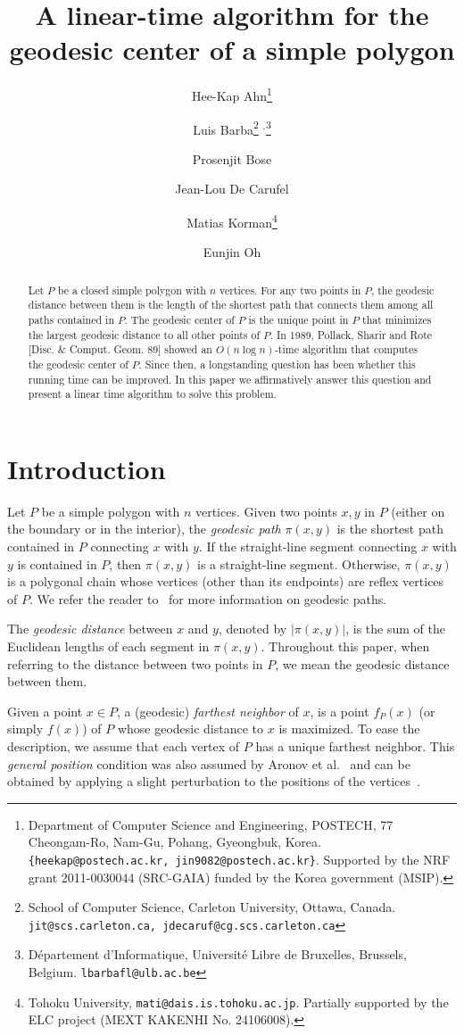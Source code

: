 \documentclass[a4paper]{article}
\title{A linear-time algorithm for the geodesic center of a simple polygon}
\author{
Hee-Kap Ahn\thanks{Department of Computer Science and Engineering, POSTECH,
77 Cheongam-Ro, Nam-Gu, Pohang, Gyeongbuk, Korea.  \texttt{\{heekap@postech.ac.kr, jin9082@postech.ac.kr\}}. Supported by the NRF grant 2011-0030044 (SRC-GAIA) funded by the Korea government (MSIP).}
\and
Luis Barba\thanks{School of Computer Science, Carleton University, Ottawa, Canada.
\texttt{jit@scs.carleton.ca, jdecaruf@cg.scs.carleton.ca}} $^,$\thanks{D\'epartement d'Informatique, Universit\'e Libre de Bruxelles, Brussels, Belgium. \texttt{lbarbafl@ulb.ac.be}}
\and
Prosenjit Bose\footnotemark[2]
\and
Jean-Lou De Carufel\footnotemark[2]
\and 
Matias Korman\thanks{Tohoku University, {\tt mati@dais.is.tohoku.ac.jp}. Partially supported by the ELC project (MEXT KAKENHI No. 24106008).}
\and
Eunjin Oh\footnotemark[1]%
}
\newcommand{\f}[2]{\ensuremath{f_{\scriptscriptstyle #1}(#2)}}
\newcommand{\ff}[1]{\ensuremath{f(#1)}}
\newcommand{\g}[2]{\ensuremath{|\pi(#1, #2)|}}
\newcommand{\p}[2]{\ensuremath{\pi(#1, #2)}}
\begin{document}
\maketitle

\begin{abstract}
Let $P$ be a closed simple polygon with $n$ vertices.
For any two points in $P$, the geodesic distance between them is the length of the shortest path that connects them among all paths contained in $P$. The  geodesic center of $P$ is the unique point in $P$ that minimizes the largest geodesic distance to all other points of $P$. In 1989, Pollack, Sharir and Rote [Disc. \& Comput. Geom. 89] showed an $O(n\log n)$-time algorithm that computes the geodesic center of $P$. Since then, a longstanding question has been whether this running time can be improved. 
In this paper we affirmatively answer this question and present a linear time algorithm to solve this problem.
\end{abstract}



\section{Introduction}
Let $P$ be a simple polygon with $n$ vertices.
Given two points $x,y$ in $P$ (either on the boundary or in the interior), the \emph{geodesic path} $\p{x}{y}$ is the shortest path contained in $P$ connecting $x$ with $y$. If the straight-line segment connecting $x$ with $y$ is contained in $P$, then $\p{x}{y}$ is a straight-line segment. Otherwise, $\p{x}{y}$ is a polygonal chain whose vertices (other than its endpoints) are  reflex vertices of $P$. We refer the reader to~\cite{m-gspno-00} for more information on geodesic paths.

The \emph{geodesic distance} between $x$ and $y$, denoted by $\g{x}{y}$, is the sum of the Euclidean lengths of each segment in $\p{x}{y}$. Throughout this paper, when referring to the distance between two points in $P$, we mean the geodesic distance between them. 

Given a point $x\in P$, a (geodesic) \emph{farthest neighbor} of $x$, is a point $\f{P}{x}$ (or simply $\ff{x}$) of $P$ whose geodesic distance to $x$ is maximized. 
To ease the description, we assume that each vertex of $P$ has a unique farthest neighbor. 
This \emph{general position} condition was also assumed by Aronov et al.~\cite{aronov1993furthest} and can be obtained by applying a slight perturbation to the positions of the vertices~\cite{edelsbrunner1990simulation}.
\end{document}
